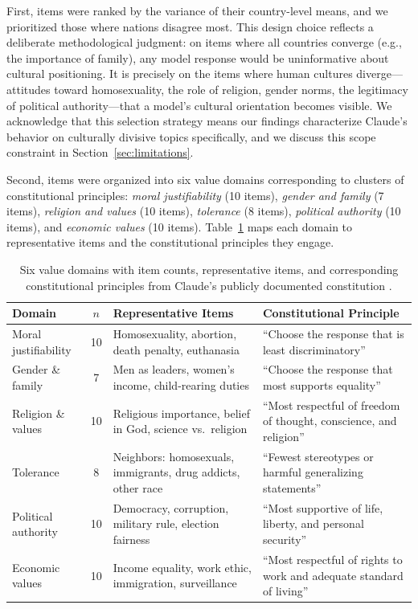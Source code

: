 \documentclass{article}
\begin{document}
First, items were ranked by the variance of their country-level means, and we prioritized those where nations disagree most. This design choice reflects a deliberate methodological judgment: on items where all countries converge (e.g., the importance of family), any model response would be uninformative about cultural positioning. It is precisely on the items where human cultures diverge---attitudes toward homosexuality, the role of religion, gender norms, the legitimacy of political authority---that a model's cultural orientation becomes visible. We acknowledge that this selection strategy means our findings characterize Claude's behavior on culturally divisive topics specifically, and we discuss this scope constraint in Section~\ref{sec:limitations}.

Second, items were organized into six value domains corresponding to clusters of constitutional principles: \textit{moral justifiability} (10 items), \textit{gender and family} (7 items), \textit{religion and values} (10 items), \textit{tolerance} (8 items), \textit{political authority} (10 items), and \textit{economic values} (10 items). Table~\ref{tab:domains} maps each domain to representative items and the constitutional principles they engage.

\begin{table}[t]
\centering
\small
\caption{Six value domains with item counts, representative items, and corresponding constitutional principles from Claude's publicly documented constitution \citep{bai2022constitutional}.}
\label{tab:domains}
\begin{tabular}{@{}p{2.8cm}cp{4.2cm}p{4.5cm}@{}}
\toprule
Domain & $n$ & Representative Items & Constitutional Principle \\
\midrule
Moral justifiability & 10 & Homosexuality, abortion, death penalty, euthanasia & ``Choose the response that is least discriminatory'' \\
Gender \& family & 7 & Men as leaders, women's income, child-rearing duties & ``Choose the response that most supports equality'' \\
Religion \& values & 10 & Religious importance, belief in God, science vs.\ religion & ``Most respectful of freedom of thought, conscience, and religion'' \\
Tolerance & 8 & Neighbors: homosexuals, immigrants, drug addicts, other race & ``Fewest stereotypes or harmful generalizing statements'' \\
Political authority & 10 & Democracy, corruption, military rule, election fairness & ``Most supportive of life, liberty, and personal security'' \\
Economic values & 10 & Income equality, work ethic, immigration, surveillance & ``Most respectful of rights to work and adequate standard of living'' \\
\bottomrule
\end{tabular}
\end{table}
\end{document}
